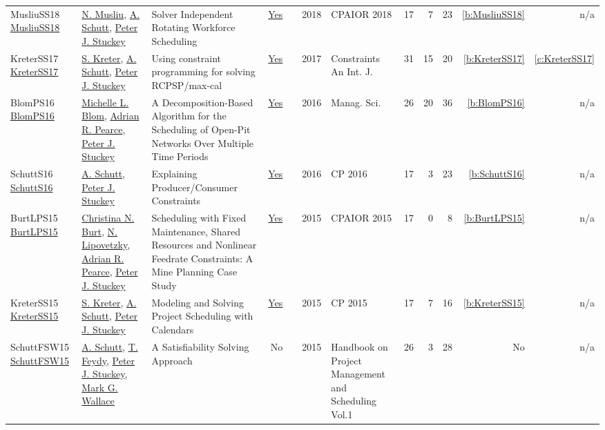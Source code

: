 {\begin{longtable}{>{\raggedright\arraybackslash}p{3cm}>{\raggedright\arraybackslash}p{6cm}>{\raggedright\arraybackslash}p{6.5cm}rrrp{2.5cm}rrrrr}
MusliuSS18 \href{https://doi.org/10.1007/978-3-319-93031-2_31}{MusliuSS18} & \hyperref[auth:a45]{N. Musliu}, \hyperref[auth:a125]{A. Schutt}, \hyperref[auth:a126]{Peter J. Stuckey} & Solver Independent Rotating Workforce Scheduling & \href{../works/MusliuSS18.pdf}{Yes} & \cite{MusliuSS18} & 2018 & CPAIOR 2018 & 17 & 7 & 23 & \ref{b:MusliuSS18} & n/a\\
KreterSS17 \href{https://doi.org/10.1007/s10601-016-9266-6}{KreterSS17} & \hyperref[auth:a124]{S. Kreter}, \hyperref[auth:a125]{A. Schutt}, \hyperref[auth:a126]{Peter J. Stuckey} & Using constraint programming for solving RCPSP/max-cal & \href{../works/KreterSS17.pdf}{Yes} & \cite{KreterSS17} & 2017 & Constraints An Int. J. & 31 & 15 & 20 & \ref{b:KreterSS17} & \ref{c:KreterSS17}\\
BlomPS16 \href{https://doi.org/10.1287/mnsc.2015.2284}{BlomPS16} & \hyperref[auth:a801]{Michelle L. Blom}, \hyperref[auth:a327]{Adrian R. Pearce}, \hyperref[auth:a126]{Peter J. Stuckey} & A Decomposition-Based Algorithm for the Scheduling of Open-Pit Networks Over Multiple Time Periods & \href{../works/BlomPS16.pdf}{Yes} & \cite{BlomPS16} & 2016 & Manag. Sci. & 26 & 20 & 36 & \ref{b:BlomPS16} & n/a\\
SchuttS16 \href{https://doi.org/10.1007/978-3-319-44953-1_28}{SchuttS16} & \hyperref[auth:a125]{A. Schutt}, \hyperref[auth:a126]{Peter J. Stuckey} & Explaining Producer/Consumer Constraints & \href{../works/SchuttS16.pdf}{Yes} & \cite{SchuttS16} & 2016 & CP 2016 & 17 & 3 & 23 & \ref{b:SchuttS16} & n/a\\
BurtLPS15 \href{https://doi.org/10.1007/978-3-319-18008-3_7}{BurtLPS15} & \hyperref[auth:a325]{Christina N. Burt}, \hyperref[auth:a326]{N. Lipovetzky}, \hyperref[auth:a327]{Adrian R. Pearce}, \hyperref[auth:a126]{Peter J. Stuckey} & Scheduling with Fixed Maintenance, Shared Resources and Nonlinear Feedrate Constraints: {A} Mine Planning Case Study & \href{../works/BurtLPS15.pdf}{Yes} & \cite{BurtLPS15} & 2015 & CPAIOR 2015 & 17 & 0 & 8 & \ref{b:BurtLPS15} & n/a\\
KreterSS15 \href{https://doi.org/10.1007/978-3-319-23219-5_19}{KreterSS15} & \hyperref[auth:a124]{S. Kreter}, \hyperref[auth:a125]{A. Schutt}, \hyperref[auth:a126]{Peter J. Stuckey} & Modeling and Solving Project Scheduling with Calendars & \href{../works/KreterSS15.pdf}{Yes} & \cite{KreterSS15} & 2015 & CP 2015 & 17 & 7 & 16 & \ref{b:KreterSS15} & n/a\\
SchuttFSW15 \href{https://doi.org/10.1007/978-3-319-05443-8_7}{SchuttFSW15} & \hyperref[auth:a125]{A. Schutt}, \hyperref[auth:a155]{T. Feydy}, \hyperref[auth:a126]{Peter J. Stuckey}, \hyperref[auth:a117]{Mark G. Wallace} & A Satisfiability Solving Approach & No & \cite{SchuttFSW15} & 2015 & Handbook on Project Management and Scheduling Vol.1 & 26 & 3 & 28 & No & n/a\\

\end{longtable}}
